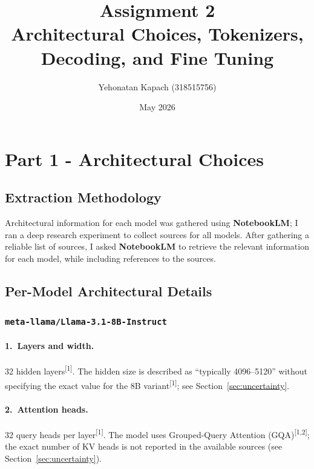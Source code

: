 \documentclass[11pt, a4paper]{article}
\title{\textbf{Assignment 2}\\[6pt]
       \large Architectural Choices, Tokenizers, Decoding, and Fine Tuning}
\author{Yehonatan Kapach (318515756)}
\date{May 2026}
\newcommand{\src}[1]{\textsuperscript{\normalfont\small[#1]}}
\begin{document}
\maketitle
\tableofcontents
\newpage

\section{Part 1 - Architectural Choices}

\subsection{Extraction Methodology}

Architectural information for each model was gathered using \textbf{NotebookLM};
I ran a deep research experiment to collect sources for all models. 
After gathering a reliable list of sources, I asked \textbf{NotebookLM} to retrieve the relevant information for each model, while including references to the sources.

\subsection{Per-Model Architectural Details}

\subsubsection{\texttt{meta-llama/Llama-3.1-8B-Instruct}}

\paragraph{1.~Layers and width.}
32 hidden layers\src{1}.
The hidden size is described as ``typically 4096--5120'' without specifying the
exact value for the 8B variant\src{1}; see Section~\ref{sec:uncertainty}.

\paragraph{2.~Attention heads.}
32 query heads per layer\src{1}.
The model uses Grouped-Query Attention (GQA)\src{1,2};
the exact number of KV heads is not reported in the available sources (see
Section~\ref{sec:uncertainty}).
\end{document}

